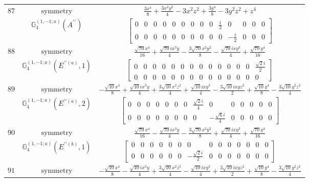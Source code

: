 \documentclass[fleqn,8pt,landscape]{jsarticle}
\begin{document}
\begin{longtable}{ccc}
$ 87 $ & $ \text{symmetry} $ & $ \frac{3 x^{4}}{8} + \frac{3 x^{2} y^{2}}{4} - 3 x^{2} z^{2} + \frac{3 y^{4}}{8} - 3 y^{2} z^{2} + z^{4} $ \\
$  $ & $ \mathbb{G}_{4}^{(1,-1;a)}(A^{\prime\prime}) $ & $ \begin{bmatrix} 0 & 0 & 0 & 0 & 0 & 0 & 0 & 0 & 0 & \frac{i}{2} & 0 & 0 & 0 & 0 \\ 0 & 0 & 0 & 0 & 0 & 0 & 0 & 0 & 0 & 0 & - \frac{i}{2} & 0 & 0 & 0 \end{bmatrix} $ \\ \hline
$ 88 $ & $ \text{symmetry} $ & $ \frac{\sqrt{70} x^{4}}{16} + \frac{\sqrt{70} i x^{3} y}{4} - \frac{3 \sqrt{70} x^{2} y^{2}}{8} - \frac{\sqrt{70} i x y^{3}}{4} + \frac{\sqrt{70} y^{4}}{16} $ \\
$  $ & $ \mathbb{G}_{4}^{(1,-1;a)}(E^{\prime\prime(a)},1) $ & $ \begin{bmatrix} 0 & 0 & 0 & 0 & 0 & 0 & 0 & 0 & 0 & 0 & 0 & 0 & 0 & \frac{\sqrt{2} i}{2} \\ 0 & 0 & 0 & 0 & 0 & 0 & 0 & 0 & 0 & 0 & 0 & 0 & 0 & 0 \end{bmatrix} $ \\ \hline
$ 89 $ & $ \text{symmetry} $ & $ - \frac{\sqrt{10} x^{4}}{8} + \frac{\sqrt{10} i x^{3} y}{4} + \frac{3 \sqrt{10} x^{2} z^{2}}{4} + \frac{\sqrt{10} i x y^{3}}{4} - \frac{3 \sqrt{10} i x y z^{2}}{2} + \frac{\sqrt{10} y^{4}}{8} - \frac{3 \sqrt{10} y^{2} z^{2}}{4} $ \\
$  $ & $ \mathbb{G}_{4}^{(1,-1;a)}(E^{\prime\prime(a)},2) $ & $ \begin{bmatrix} 0 & 0 & 0 & 0 & 0 & 0 & 0 & \frac{\sqrt{2} i}{4} & 0 & 0 & 0 & 0 & 0 & 0 \\ 0 & 0 & 0 & 0 & 0 & 0 & 0 & 0 & - \frac{\sqrt{6} i}{4} & 0 & 0 & 0 & 0 & 0 \end{bmatrix} $ \\ \hline
$ 90 $ & $ \text{symmetry} $ & $ \frac{\sqrt{70} x^{4}}{16} - \frac{\sqrt{70} i x^{3} y}{4} - \frac{3 \sqrt{70} x^{2} y^{2}}{8} + \frac{\sqrt{70} i x y^{3}}{4} + \frac{\sqrt{70} y^{4}}{16} $ \\
$  $ & $ \mathbb{G}_{4}^{(1,-1;a)}(E^{\prime\prime(b)},1) $ & $ \begin{bmatrix} 0 & 0 & 0 & 0 & 0 & 0 & 0 & 0 & 0 & 0 & 0 & 0 & 0 & 0 \\ 0 & 0 & 0 & 0 & 0 & 0 & - \frac{\sqrt{2} i}{2} & 0 & 0 & 0 & 0 & 0 & 0 & 0 \end{bmatrix} $ \\ \hline
$ 91 $ & $ \text{symmetry} $ & $ - \frac{\sqrt{10} x^{4}}{8} - \frac{\sqrt{10} i x^{3} y}{4} + \frac{3 \sqrt{10} x^{2} z^{2}}{4} - \frac{\sqrt{10} i x y^{3}}{4} + \frac{3 \sqrt{10} i x y z^{2}}{2} + \frac{\sqrt{10} y^{4}}{8} - \frac{3 \sqrt{10} y^{2} z^{2}}{4} $ \\

\end{longtable}
\end{document}
